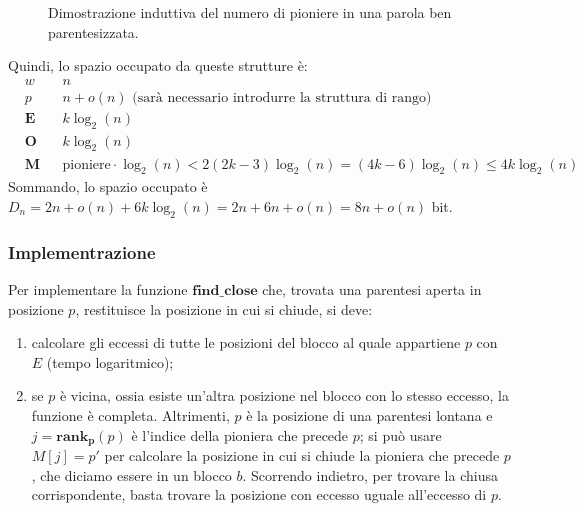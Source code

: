 \begin{figure}[h]
\begin{subfigure}{0.45\textwidth}
	\end{subfigure}
	\caption{Dimostrazione induttiva del numero di pioniere in una parola ben parentesizzata.}
	\label{fig:proof_pioneers}
\end{figure}

Quindi, lo spazio occupato da queste strutture è:
$$
	\begin{aligned}
		 & w          &  & n                                                                                          \\
		 & p          &  & n + o(n) \text{ (sarà necessario introdurre la struttura di rango)}                        \\
		 & \mathbf{E} &  & k  \log_2(n)                                                                               \\
		 & \mathbf{O} &  & k  \log_2(n)                                                                               \\
		 & \mathbf{M} &  & \text{pioniere} \cdot \log_2(n) < 2(2k - 3) \log_2(n) = (4k - 6) \log_2(n) \le 4k\log_2(n)
	\end{aligned}
$$
Sommando, lo spazio occupato è $D_n = 2n + o(n) + 6k \log_2(n) = 2n + 6n + o(n) = 8n + o(n)$ bit.

\subsubsection{Implementrazione}
Per implementare la funzione $\mathbf{find\_close}$ che, trovata una parentesi aperta in posizione $p$, restituisce
la posizione in cui si chiude, si deve:
\begin{enumerate}
	\item calcolare gli eccessi di tutte le posizioni del blocco al quale appartiene $p$ con $E$ (tempo logaritmico);
	\item se $p$ è vicina, ossia esiste un'altra posizione nel blocco con lo stesso eccesso,
	      la funzione è completa. Altrimenti, $p$ è la posizione di una parentesi lontana e
	      $j = \mathbf{rank_p}(p)$ è l'indice della pioniera che precede $p$; si può usare $M[j] = p'$ per
	      calcolare la posizione in cui si chiude la pioniera che precede $p$, che diciamo essere in un
	      blocco $b$. Scorrendo indietro, per trovare la chiusa corrispondente, basta trovare la
	      posizione con eccesso uguale all'eccesso di $p$.
\end{enumerate}

